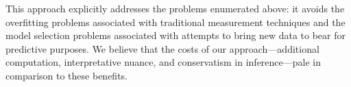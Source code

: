 This approach explicitly addresses the problems enumerated above:  it avoids the overfitting problems associated with traditional measurement techniques and the model selection problems associated with attempts to bring new data to bear for predictive purposes.  We believe that the costs of our approach---additional computation, interpretative nuance, and conservatism in inference---pale in comparison to these benefits. 